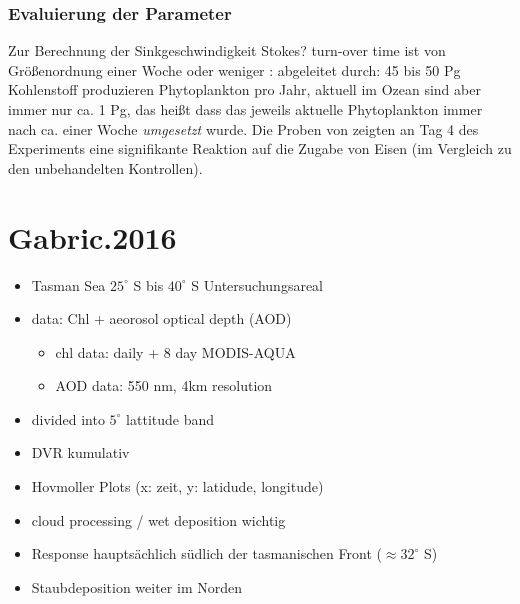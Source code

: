\documentclass[12pt,a4paper,onecolumn]{scrartcl}
\begin{document}
\subsubsection{Evaluierung der Parameter}
Zur Berechnung der Sinkgeschwindigkeit Stokes?
turn-over time ist von Größenordnung einer Woche oder weniger \citep{Falkowski.1998}: abgeleitet durch: 45 bis 50 Pg Kohlenstoff produzieren Phytoplankton pro Jahr, aktuell im Ozean sind aber immer nur ca. 1 Pg, das heißt dass das jeweils aktuelle Phytoplankton immer nach ca. einer Woche \textit{umgesetzt} wurde. Die Proben von \citet{Martin.1988} zeigten an Tag 4 des Experiments eine signifikante Reaktion auf die Zugabe von Eisen (im Vergleich zu den unbehandelten Kontrollen).



\section{Gabric.2016}

\begin{itemize}
\item Tasman Sea $25^\circ$ S bis $40^\circ$ S Untersuchungsareal
\item data: Chl + aeorosol optical depth (AOD)
\begin{itemize}
\item chl data: daily + 8 day MODIS-AQUA
\item AOD data: 550 nm, 4km resolution
\end{itemize}
\item divided into $5^\circ$ lattitude band
\item DVR kumulativ
\item Hovmoller Plots (x: zeit, y: latidude, longitude)
\item cloud processing / wet deposition wichtig
\item Response hauptsächlich südlich der tasmanischen Front ($\approx 32^\circ$ S)
\item Staubdeposition weiter im Norden
\end{itemize}
\end{document}
